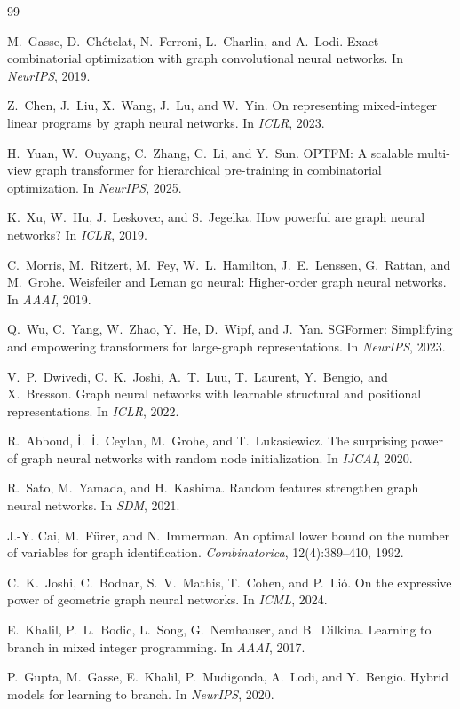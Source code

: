 \documentclass[11pt]{article}
\theoremstyle{plain}
\theoremstyle{definition}
\theoremstyle{remark}
\begin{document}
\begin{thebibliography}{99}\small

M.~Gasse, D.~Ch\'etelat, N.~Ferroni, L.~Charlin, and A.~Lodi.
Exact combinatorial optimization with graph convolutional neural networks.
In \emph{NeurIPS}, 2019.

Z.~Chen, J.~Liu, X.~Wang, J.~Lu, and W.~Yin.
On representing mixed-integer linear programs by graph neural networks.
In \emph{ICLR}, 2023.

H.~Yuan, W.~Ouyang, C.~Zhang, C.~Li, and Y.~Sun.
{OPTFM}: A scalable multi-view graph transformer for hierarchical
pre-training in combinatorial optimization.
In \emph{NeurIPS}, 2025.

K.~Xu, W.~Hu, J.~Leskovec, and S.~Jegelka.
How powerful are graph neural networks?
In \emph{ICLR}, 2019.

C.~Morris, M.~Ritzert, M.~Fey, W.~L.~Hamilton, J.~E.~Lenssen, G.~Rattan, and M.~Grohe.
Weisfeiler and {L}eman go neural: Higher-order graph neural networks.
In \emph{AAAI}, 2019.

Q.~Wu, C.~Yang, W.~Zhao, Y.~He, D.~Wipf, and J.~Yan.
{SGFormer}: Simplifying and empowering transformers for large-graph
representations.
In \emph{NeurIPS}, 2023.

V.~P.~Dwivedi, C.~K.~Joshi, A.~T.~Luu, T.~Laurent, Y.~Bengio, and X.~Bresson.
Graph neural networks with learnable structural and positional representations.
In \emph{ICLR}, 2022.

R.~Abboud, \.{I}.~\.{I}.~Ceylan, M.~Grohe, and T.~Lukasiewicz.
The surprising power of graph neural networks with random node initialization.
In \emph{IJCAI}, 2020.

R.~Sato, M.~Yamada, and H.~Kashima.
Random features strengthen graph neural networks.
In \emph{SDM}, 2021.

J.-Y. Cai, M.~F\"urer, and N.~Immerman.
An optimal lower bound on the number of variables for graph identification.
\emph{Combinatorica}, 12(4):389--410, 1992.

C.~K.~Joshi, C.~Bodnar, S.~V.~Mathis, T.~Cohen, and P.~Li\'o.
On the expressive power of geometric graph neural networks.
In \emph{ICML}, 2024.

E.~Khalil, P.~L.~Bodic, L.~Song, G.~Nemhauser, and B.~Dilkina.
Learning to branch in mixed integer programming.
In \emph{AAAI}, 2017.

P.~Gupta, M.~Gasse, E.~Khalil, P.~Mudigonda, A.~Lodi, and Y.~Bengio.
Hybrid models for learning to branch.
In \emph{NeurIPS}, 2020.

\end{thebibliography}
\end{document}
